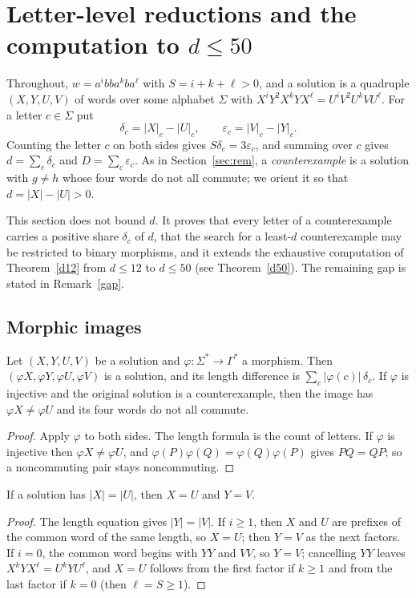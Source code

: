 \section{Letter-level reductions and the computation to \(d\le 50\)}\label{sec:letters}
Throughout, \(w=a^ibba^kba^\ell\) with \(S=i+k+\ell>0\), and a solution is a quadruple \((X,Y,U,V)\) of words over some alphabet \(\Sigma\) with \(X^iY^2X^kYX^\ell=U^iV^2U^kVU^\ell\). For a letter \(c\in\Sigma\) put
\[
\delta_c=|X|_c-|U|_c,\qquad \varepsilon_c=|V|_c-|Y|_c .
\]
Counting the letter \(c\) on both sides gives \(S\delta_c=3\varepsilon_c\), and summing over \(c\) gives \(d=\sum_c\delta_c\) and \(D=\sum_c\varepsilon_c\). As in Section~\ref{sec:rem}, a \emph{counterexample} is a solution with \(g\ne h\) whose four words do not all commute; we orient it so that \(d=|X|-|U|>0\).

This section does not bound \(d\). It proves that every letter of a counterexample carries a positive share \(\delta_c\) of \(d\), that the search for a least-\(d\) counterexample may be restricted to binary morphisms, and it extends the exhaustive computation of Theorem~\ref{d12} from \(d\le12\) to \(d\le 50\) (see Theorem~\ref{d50}). The remaining gap is stated in Remark~\ref{gap}.

\subsection{Morphic images}
\begin{lemma}\label{image}
Let \((X,Y,U,V)\) be a solution and \(\varphi\colon\Sigma^*\to\Gamma^*\) a morphism. Then \((\varphi X,\varphi Y,\varphi U,\varphi V)\) is a solution, and its length difference is \(\sum_c|\varphi(c)|\,\delta_c\). If \(\varphi\) is injective and the original solution is a counterexample, then the image has \(\varphi X\ne\varphi U\) and its four words do not all commute.
\end{lemma}
\begin{proof}
Apply \(\varphi\) to both sides. The length formula is the count of letters. If \(\varphi\) is injective then \(\varphi X\ne\varphi U\), and \(\varphi(P)\varphi(Q)=\varphi(Q)\varphi(P)\) gives \(PQ=QP\); so a noncommuting pair stays noncommuting.
\end{proof}

\begin{lemma}\label{equal}
If a solution has \(|X|=|U|\), then \(X=U\) and \(Y=V\).
\end{lemma}
\begin{proof}
The length equation gives \(|Y|=|V|\). If \(i\ge1\), then \(X\) and \(U\) are prefixes of the common word of the same length, so \(X=U\); then \(Y=V\) as the next factors. If \(i=0\), the common word begins with \(YY\) and \(VV\), so \(Y=V\); cancelling \(YY\) leaves \(X^kYX^\ell=U^kYU^\ell\), and \(X=U\) follows from the first factor if \(k\ge1\) and from the last factor if \(k=0\) (then \(\ell=S\ge1\)).
\end{proof}


